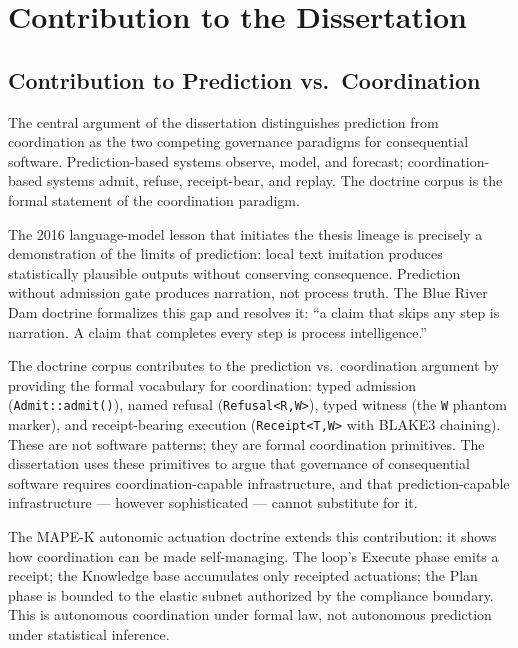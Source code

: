 \section{Contribution to the Dissertation}
\label{sec:doctrine-contribution}

\subsection{Contribution to Prediction vs.~Coordination}
\label{sec:doctrine-contribution-prediction}

The central argument of the dissertation distinguishes prediction from coordination as the
two competing governance paradigms for consequential software. Prediction-based systems
observe, model, and forecast; coordination-based systems admit, refuse, receipt-bear, and
replay. The doctrine corpus is the formal statement of the coordination paradigm.

The 2016 language-model lesson that initiates the thesis lineage is precisely a demonstration
of the limits of prediction: local text imitation produces statistically plausible outputs
without conserving consequence. Prediction without admission gate produces narration, not
process truth. The Blue River Dam doctrine formalizes this gap and resolves it: ``a claim
that skips any step is narration. A claim that completes every step is process intelligence.''

The doctrine corpus contributes to the prediction vs.\ coordination argument by providing the
formal vocabulary for coordination: typed admission (\texttt{Admit::admit()}), named refusal
(\texttt{Refusal\textless{}R,W\textgreater{}}), typed witness (the \texttt{W} phantom marker),
and receipt-bearing execution (\texttt{Receipt\textless{}T,W\textgreater{}} with BLAKE3
chaining). These are not software patterns; they are formal coordination primitives. The
dissertation uses these primitives to argue that governance of consequential software requires
coordination-capable infrastructure, and that prediction-capable infrastructure --- however
sophisticated --- cannot substitute for it.

The MAPE-K autonomic actuation doctrine extends this contribution: it shows how coordination
can be made self-managing. The loop's Execute phase emits a receipt; the Knowledge base
accumulates only receipted actuations; the Plan phase is bounded to the elastic subnet
authorized by the compliance boundary. This is autonomous coordination under formal law, not
autonomous prediction under statistical inference.


